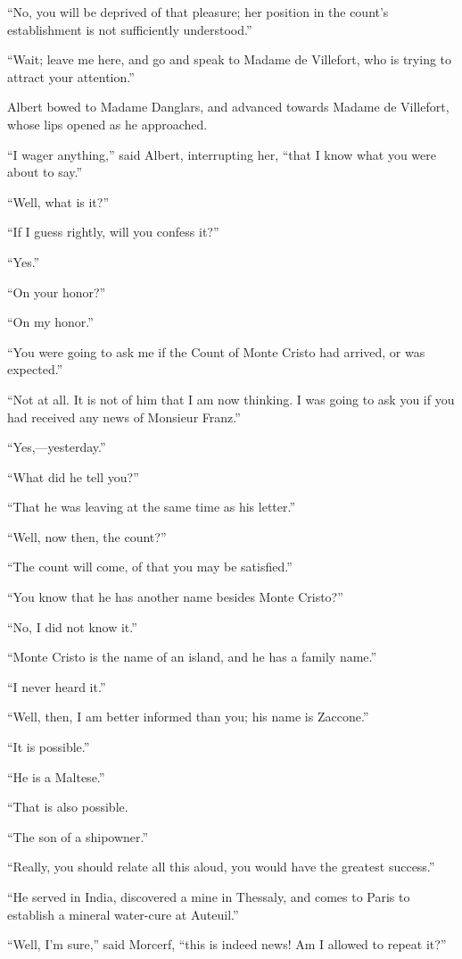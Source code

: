“No, you will be deprived of that pleasure; her position in the count’s
establishment is not sufficiently understood.”

“Wait; leave me here, and go and speak to Madame de Villefort, who is
trying to attract your attention.”

Albert bowed to Madame Danglars, and advanced towards Madame de
Villefort, whose lips opened as he approached.

“I wager anything,” said Albert, interrupting her, “that I know what
you were about to say.”

“Well, what is it?”

“If I guess rightly, will you confess it?”

“Yes.”

“On your honor?”

“On my honor.”

“You were going to ask me if the Count of Monte Cristo had arrived, or
was expected.”

“Not at all. It is not of him that I am now thinking. I was going to
ask you if you had received any news of Monsieur Franz.”

“Yes,—yesterday.”

“What did he tell you?”

“That he was leaving at the same time as his letter.”

“Well, now then, the count?”

“The count will come, of that you may be satisfied.”

“You know that he has another name besides Monte Cristo?”

“No, I did not know it.”

“Monte Cristo is the name of an island, and he has a family name.”

“I never heard it.”

“Well, then, I am better informed than you; his name is Zaccone.”

“It is possible.”

“He is a Maltese.”

“That is also possible.

“The son of a shipowner.”

“Really, you should relate all this aloud, you would have the greatest
success.”

“He served in India, discovered a mine in Thessaly, and comes to Paris
to establish a mineral water-cure at Auteuil.”

“Well, I’m sure,” said Morcerf, “this is indeed news! Am I allowed to
repeat it?”

